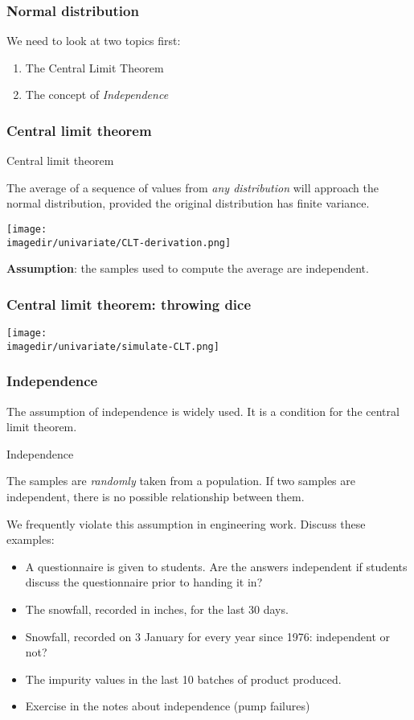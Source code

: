 \begin{frame}\frametitle{Normal distribution}

	We need to look at two topics first:
	\begin{enumerate}
		\item The Central Limit Theorem
		\item The concept of \emph{Independence}
	\end{enumerate}
\end{frame}

\begin{frame}\frametitle{Central limit theorem}
	\begin{block}
		{Central limit theorem}
		\begin{center}
			The average of a sequence of values from \emph{any distribution} will approach the normal distribution, provided the original distribution has finite variance.
		\end{center}
	\end{block}

	\texttt{[image: \\imagedir/univariate/CLT-derivation.png]}

	\textbf{Assumption}: the samples used to compute the average are independent.
\end{frame}

\begin{frame}\frametitle{Central limit theorem: throwing dice}

	\texttt{[image: \\imagedir/univariate/simulate-CLT.png]}
\end{frame}

\begin{frame}\frametitle{Independence}

	The assumption of independence is widely used. It is a condition for the central limit theorem.
	\begin{block}
		{Independence}
		\begin{center}
			The samples are \emph{randomly} taken from a population. If two samples are independent, there is no possible relationship between them.
		\end{center}
	\end{block}

	We frequently violate this assumption in engineering work. Discuss these examples:
	\begin{itemize}
		\item A questionnaire is given to students. Are the answers independent if students discuss the questionnaire prior to handing it in?
		\item The snowfall, recorded in inches, for the last 30 days.
		\item Snowfall, recorded on 3 January for every year since 1976: independent or not?
		\item The impurity values in the last 10 batches of product produced.
		\item Exercise in the notes about independence (pump failures)
	\end{itemize}
\end{frame}

